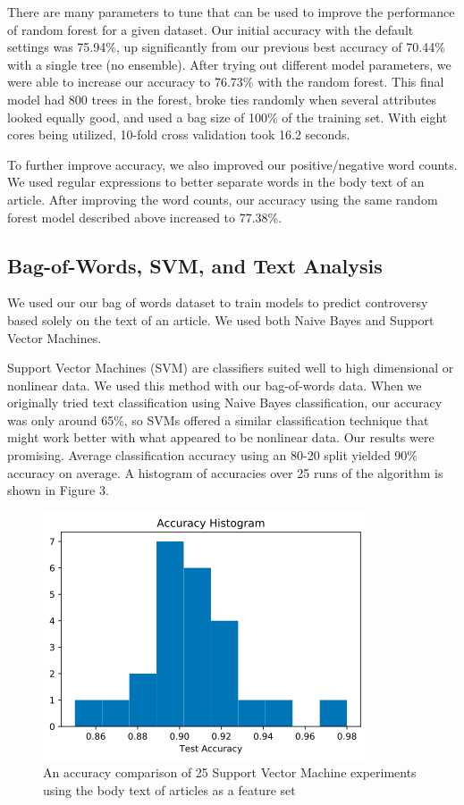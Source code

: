 \documentclass{article}
\begin{document}
There are many parameters to tune that can be used to improve the performance of random forest for a given dataset. Our initial accuracy with the default settings was 75.94\%, up significantly from our previous best accuracy of 70.44\% with a single tree (no ensemble). After trying out different model parameters, we were able to increase our accuracy to 76.73\% with the random forest. This final model had 800 trees in the forest, broke ties randomly when several attributes looked equally good, and used a bag size of 100\% of the training set. With eight cores being utilized, 10-fold cross validation took 16.2 seconds.

To further improve accuracy, we also improved our positive/negative word counts. We used regular expressions to better separate words in the body text of an article. After improving the word counts, our accuracy using the same random forest model described above increased to 77.38\%.

\subsection{Bag-of-Words, SVM, and Text Analysis}

We used our our bag of words dataset to train models to predict controversy based solely on the text of an article. We used both Naive Bayes and Support Vector Machines.

Support Vector Machines (SVM) are classifiers suited well to high dimensional or nonlinear data. We used this method with our bag-of-words data. When we originally tried text classification using Naive Bayes classification, our accuracy was only around 65\%, so SVMs offered a similar classification technique that might work better with what appeared to be nonlinear data. Our results were promising. Average classification accuracy using an 80-20 split yielded 90\% accuracy on average. A histogram of accuracies over 25 runs of the algorithm is shown in Figure 3.

\begin{figure}[t]
	\centering
	\includegraphics[width=\columnwidth]{images/svm.png}
	\caption{An accuracy comparison of 25 Support Vector Machine experiments using the body text of articles as a feature set}
	\label{fig:svm}
\end{figure}
\end{document}
